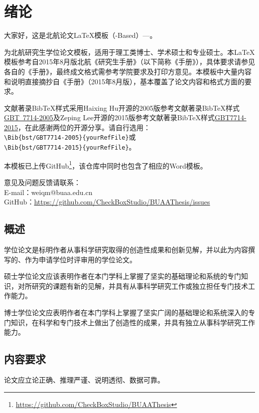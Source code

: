 \chapter{绪论}

大家好，这是北航论文\LaTeX{}模板（\CTeX{}-Based）---\BUAAThesis{}。

\BUAAThesis{}为北航研究生学位论文模板，适用于理工类博士、学术硕士和专业硕士。本\LaTeX{}模板参考自2015年8月版北航《研究生手册》（以下简称《手册》），具体要求请参见各自的《手册》，最终成文格式需参考学院要求及打印方意见。本模板中大量内容和说明直接摘抄自《手册》（2015年8月版），基本覆盖了论文内容和格式方面的要求。

文献著录BibTeX样式采用Haixing Hu开源的2005版参考文献著录BibTeX样式\href{https://github.com/Haixing-Hu/GBT7714-2005-BibTeX-Style}{GBT~7714-2005}及Zeping Lee开源的2015版参考文献著录BibTeX样式\href{https://github.com/zepinglee/gbt7714-bibtex-style}{GBT7714-2015}，在此感谢两位的开源分享。请自行选用：\\
\verb|\Bib{bst/GBT7714-2005}{yourRefFile}|或\\
\verb|\Bib{bst/GBT7714-2015}{yourRefFile}|。


本模板已上传GitHub\footnote{\href{https://github.com/CheckBoxStudio/BUAAThesis}{https://github.com/CheckBoxStudio/BUAAThesis}}，该仓库中同时也包含了相应的Word模板。

意见及问题反馈请联系：\\
\indent E-mail：weiqm@buaa.edu.cn\\
\indent GitHub：\href{https://github.com/CheckBoxStudio/BUAAThesis/issues}{https://github.com/CheckBoxStudio/BUAAThesis/issues}

\section{概述}
学位论文是标明作者从事科学研究取得的创造性成果和创新见解，并以此为内容撰写的、作为申请学位时评审用的学位论文。

硕士学位论文应该表明作者在本门学科上掌握了坚实的基础理论和系统的专门知识，对所研究的课题有新的见解，并具有从事科学研究工作或独立担任专门技术工作能力。

博士学位论文应表明作者在本门学科上掌握了坚实广阔的基础理论和系统深入的专门知识，在科学和专门技术上做出了创造性的成果，并具有独立从事科学研究工作能力。

\section{内容要求}
论文应立论正确、推理严谨、说明透彻、数据可靠。

